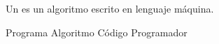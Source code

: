 
\question Un \fillin \enspace es un algoritmo escrito en lenguaje máquina.

  \begin{oneparchoices}
    \CorrectChoice Programa
    \choice Algoritmo
    \choice Código
    \choice Programador
  \end{oneparchoices}
